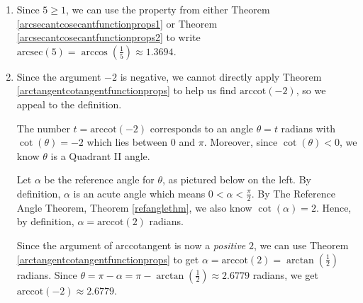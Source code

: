 \documentclass{ximera}
\begin{document}
\begin{example}
\begin{explanation}
\begin{enumerate}
\begin{enumerate}
\item  Since $5 \geq 1$, we can use the property from either Theorem \ref{arcsecantcosecantfunctionprops1} or Theorem \ref{arcsecantcosecantfunctionprops2} to write $\text{arcsec}(5) = \arccos\left(\frac{1}{5}\right) \approx 1.3694$.

\item  Since the argument $-2$ is negative, we cannot directly apply  Theorem \ref{arctangentcotangentfunctionprops} to help us find  $\text{arccot}(-2)$, so we appeal to the definition.

 

The number  $t=\text{arccot}(-2)$ corresponds to an angle $\theta = t$ radians with $\cot(\theta) = -2$ which lies between  $0$ and $\pi$.  Moreover, since $\cot(\theta) < 0$, we know  $\theta$ is a Quadrant II angle.  

 

Let  $\alpha$ be the reference angle for $\theta$, as pictured below on the left. By definition, $\alpha$ is an acute angle which means $0 < \alpha < \frac{\pi}{2}$.  By The Reference Angle Theorem, Theorem \ref{refanglethm}, we also know $\cot(\alpha) = 2$.  Hence, by definition, $\alpha = \text{arccot}(2)$ radians.  

 

Since the argument of arccotangent is now a \emph{positive} $2$, we can use  Theorem \ref{arctangentcotangentfunctionprops} to get $\alpha = \text{arccot}(2) =\arctan\left(\frac{1}{2}\right)$ radians. Since $\theta = \pi - \alpha =  \pi - \arctan\left(\frac{1}{2}\right) \approx 2.6779$ radians, we get  $\text{arccot}(-2) \approx 2.6779$.

\begin{image}
\end{image}
\end{enumerate}
\end{enumerate}
\end{explanation}
\end{example}
\end{document}
